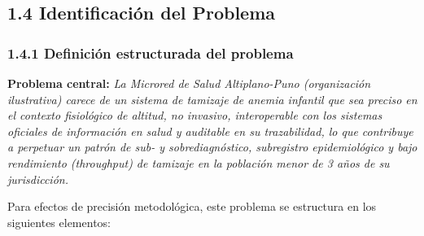\documentclass[11pt,a4paper]{article}
\begin{document}
\subsection{1.4 Identificación del Problema}\label{identificaciuxf3n-del-problema}

\subsubsection{1.4.1 Definición estructurada del problema}\label{definiciuxf3n-estructurada-del-problema}

\textbf{Problema central:} \emph{La Microred de Salud Altiplano-Puno (organización ilustrativa) carece de un sistema de tamizaje de anemia infantil que sea preciso en el contexto fisiológico de altitud, no invasivo, interoperable con los sistemas oficiales de información en salud y auditable en su trazabilidad, lo que contribuye a perpetuar un patrón de sub- y sobrediagnóstico, subregistro epidemiológico y bajo rendimiento (throughput) de tamizaje en la población menor de 3 años de su jurisdicción.}

Para efectos de precisión metodológica, este problema se estructura en los siguientes elementos:
\end{document}
